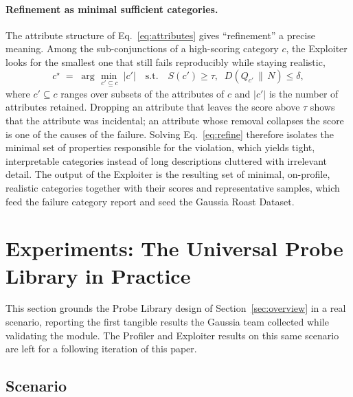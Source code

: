 \documentclass[11pt,a4paper]{article}
\begin{document}
\paragraph{Refinement as minimal sufficient categories.}
The attribute structure of Eq.~\eqref{eq:attributes} gives ``refinement'' a
precise meaning. Among the sub-conjunctions of a high-scoring category $c$, the
Exploiter looks for the smallest one that still fails reproducibly while staying realistic,
\begin{equation}
  c^\star \;=\; \arg\min_{\,c' \subseteq c}\; |c'|
  \quad \text{s.t.} \quad
  S(c') \ge \tau, \;\; D\!\left(Q_{c'} \,\|\, N\right) \le \delta,
  \label{eq:refine}
\end{equation}
where $c' \subseteq c$ ranges over subsets of the attributes of $c$ and $|c'|$ is
the number of attributes retained. Dropping an attribute that leaves the score
above $\tau$ shows that the attribute was incidental; an attribute whose removal
collapses the score is one of the causes of the failure. Solving
Eq.~\eqref{eq:refine} therefore isolates the minimal set of properties
responsible for the violation, which yields tight, interpretable categories
instead of long descriptions cluttered with irrelevant detail. The output of the
Exploiter is the resulting set of minimal, on-profile, realistic categories
together with their scores and representative samples, which feed the failure
category report and seed the Gaussia Roast Dataset.


\section{Experiments: The Universal Probe Library in Practice}
\label{sec:experiments}

This section grounds the Probe Library design of Section~\ref{sec:overview} in a
real scenario, reporting the first tangible results the Gaussia team collected
while validating the module. The Profiler and Exploiter results on this same
scenario are left for a following iteration of this paper.

\subsection{Scenario}
\end{document}

